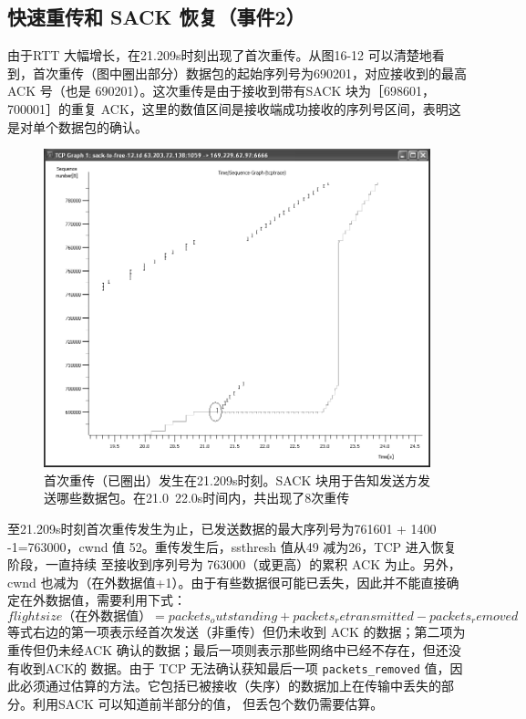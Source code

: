 \subsection{快速重传和 SACK 恢复（事件2）}

由于RTT 大幅增长，在21.209s时刻出现了首次重传。从图16-12 可以清楚地看到，首次重传（图中圈出部分）数据包的起始序列号为690201，对应接收到的最高 ACK 号（也是
690201）。这次重传是由于接收到带有SACK 块为［698601，700001］的重复 ACK，这里的数值区间是接收端成功接收的序列号区间，表明这是对单个数据包的确认。
\begin{figure}[!htb]
    \centering
	\includegraphics[width=1\textwidth]{imgs/16/16-12.png}
	\caption{首次重传（已圈出）发生在21.209s时刻。SACK 块用于告知发送方发送哪些数据包。在21.0~22.0s时间内，共出现了8次重传}
\end{figure}

至21.209s时刻首次重传发生为止，已发送数据的最大序列号为761601 + 1400 -1=763000，cwnd 值 52。重传发生后，ssthresh 值从49 减为26，TCP 进入恢复阶段，一直持续
至接收到序列号为 763000（或更高）的累积 ACK 为止。另外，cwnd 也减为（在外数据值+1）。由于有些数据很可能已丢失，因此并不能直接确定在外数据值，需要利用下式：
\begin{equation}
    flight size（在外数据值）=packets_outstanding + packets_retransmitted - packets_removed
\end{equation}
等式右边的第一项表示经首次发送（非重传）但仍未收到 ACK 的数据；第二项为重传但仍未经ACK 确认的数据；最后一项则表示那些网络中已经不存在，但还没有收到ACK的
数据。由于 TCP 无法确认获知最后一项 \verb|packets_removed| 值，因此必须通过估算的方法。它包括已被接收（失序）的数据加上在传输中丢失的部分。利用SACK 可以知道前半部分的值，
但丢包个数仍需要估算。

